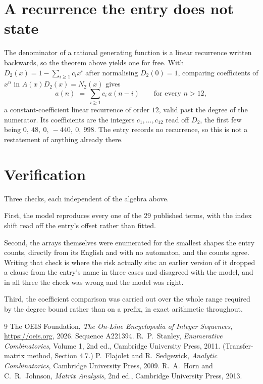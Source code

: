 \documentclass[11pt,a4paper]{article}
\theoremstyle{plain}
\theoremstyle{definition}
\begin{document}
\section{A recurrence the entry does not state}

The denominator of a rational generating function is a linear recurrence written backwards, so
the theorem above yields one for free. With $D_2(x)=1-\sum_{i\ge1}c_ix^i$ after normalising
$D_2(0)=1$, comparing coefficients of $x^n$ in $A(x)D_2(x)=N_2(x)$ gives
\[
a(n)\;=\;\sum_{i\ge1}c_i\,a(n-i)\qquad\text{for every }n>12,
\]
a constant-coefficient linear recurrence of order $12$, valid past the degree of the
numerator. Its coefficients are the integers $c_1,\dots,c_{12}$ read off $D_2$, the first few being $0,\ 48,\ 0,\ -440,\ 0,\ 998$. The entry records no recurrence, so this is not a restatement of anything
already there.

\section{Verification}

Three checks, each independent of the algebra above.

First, the model reproduces every one of the $29$ published terms, with the index shift
read off the entry's offset rather than fitted.

Second, the arrays themselves were enumerated for the smallest shapes the entry counts,
directly from its English and with no automaton, and the counts agree. Writing that check is
where the risk actually sits: an earlier version of it dropped a clause from the entry's name
in three cases and disagreed with the model, and in all three the check was wrong and the model
was right.

Third, the coefficient comparison was carried out over the whole range required by the degree
bound rather than on a prefix, in exact arithmetic throughout.

\begin{thebibliography}{9}
 The OEIS Foundation, \emph{The On-Line Encyclopedia of Integer
Sequences}, \url{https://oeis.org}, 2026. Sequence A221394.
 R.~P.~Stanley, \emph{Enumerative Combinatorics}, Volume 1, 2nd ed.,
Cambridge University Press, 2011. (Transfer-matrix method, Section 4.7.)
 P.~Flajolet and R.~Sedgewick, \emph{Analytic Combinatorics}, Cambridge
University Press, 2009.
 R.~A.~Horn and C.~R.~Johnson, \emph{Matrix Analysis}, 2nd ed., Cambridge
University Press, 2013.
\end{thebibliography}
\end{document}
